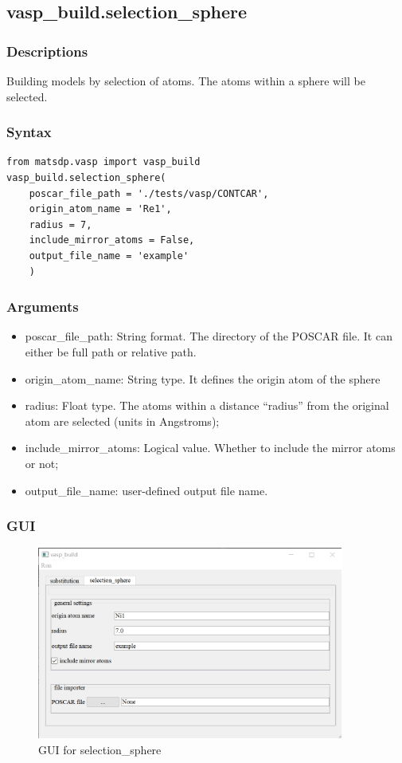 \documentclass[12pt]{book}
\begin{document}
\subsection{vasp\_build.selection\_sphere}
\subsubsection{Descriptions}
Building models by selection of atoms. The atoms within a sphere will be selected.
\subsubsection{Syntax}
\begin{lstlisting}
from matsdp.vasp import vasp_build
vasp_build.selection_sphere(
    poscar_file_path = './tests/vasp/CONTCAR',
    origin_atom_name = 'Re1',
    radius = 7,
    include_mirror_atoms = False,
    output_file_name = 'example'
    )
\end{lstlisting}
\subsubsection{Arguments}
\begin{itemize}
\item poscar\_file\_path: String format. The directory of the POSCAR file. It can either be full path or relative path.
\item origin\_atom\_name: String type. It defines the origin atom of the sphere
\item radius: Float type. The atoms within a distance ``radius'' from the original atom are selected (units in Angstroms);
\item include\_mirror\_atoms: Logical value. Whether to include the mirror atoms or not;
\item output\_file\_name: user-defined output file name.
\end{itemize}

\subsubsection{GUI}
\begin{figure}[htbp]
\centering
\includegraphics[width=0.9\textwidth]{gui_selection_sphere.pdf}
\caption{GUI for selection\_sphere}
\label{fig:GUI_selection_sphere}
\end{figure}
\end{document}
